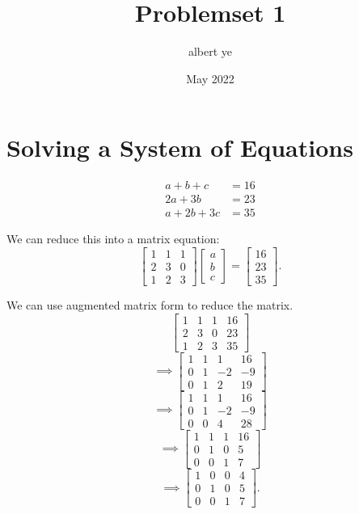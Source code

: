 \documentclass{article}
\title{Problemset 1}
\author{albert ye}
\date{May 2022}
\begin{document}
\maketitle

\section{Solving a System of Equations}

\begin{align*}
	a+b+c &= 16 \\
	2a+3b &= 23 \\
	a+2b+3c &= 35
\end{align*}

We can reduce this into a matrix equation: 
\[\begin{bmatrix}1 & 1 & 1 \\ 2 & 3 & 0 \\ 1 & 2 & 3 \end{bmatrix}
\begin{bmatrix}a \\ b \\ c \end{bmatrix} = 
\begin{bmatrix}16 \\ 23 \\ 35 \end{bmatrix}.\]

We can use augmented matrix form to reduce the matrix.
\[\left[\begin{array}{ccc|c} 1 & 1 & 1 & 16 \\ 2 & 3 & 0 & 23 \\ 1 & 2 & 3 & 35 \end{array} \right]\]
\[\implies \left[\begin{array}{ccc|c} 1 & 1 & 1 & 16 \\ 0 & 1 & -2 & -9 \\ 0 & 1 & 2 & 19 \end{array} \right]\]
\[\implies \left[\begin{array}{ccc|c} 1 & 1 & 1 & 16 \\ 0 & 1 & -2 & -9 \\ 0 & 0 & 4 & 28 \end{array} \right]\]
\[\implies \left[\begin{array}{ccc|c} 1 & 1 & 1 & 16 \\ 0 & 1 & 0 & 5 \\ 0 & 0 & 1 & 7 \end{array} \right]\]
\[\implies \left[\begin{array}{ccc|c} 1 & 0 & 0 & 4 \\ 0 & 1 & 0 & 5 \\ 0 & 0 & 1 & 7 \end{array} \right].\]
\end{document}

